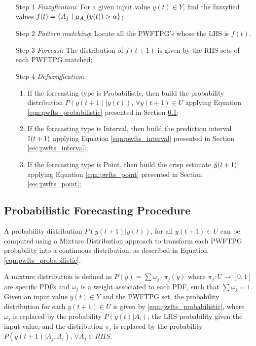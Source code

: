 \begin{enumerate}
\item[Step 1] \textit{Fuzzyfication}: For a given input value $y(t) \in Y$, find the fuzzyfied values $f(t) = \{\ufset \ |\ \mu_{\ufset}(y(t)) > \alpha\}$;
\item[Step 2] \textit{Pattern matching}:  Locate all the PWFTPG's whose the LHS is $f(t)$.
\item[Step 3] \textit{Forecast}: The distribution of $f(t+1)$ is given by the RHS sets of each PWFTPG matched;
\item[Step 4] \textit{Defuzzyfication}: 
\begin{enumerate}
    \item If the forecasting type is Probabilistic, then build the probability distribution $P(y(t+1) | y(t))$, $\forall y(t+1) \in U$ applying Equation \ref{eqn:pwfts_probabilistic} presented in Section \ref{sec:pwfts_probabilistic};
    \item If the forecasting type is Interval, then build the prediction interval $\mathbb{I}(t+1)$ applying Equation \ref{eqn:pwfts_interval} presented in Section \ref{sec:pwfts_interval};
    \item If the forecasting type is Point, then build the crisp estimate $\hat{y}(t+1)$ applying Equation \ref{eqn:pwfts_point} presented in Section \ref{sec:pwfts_point};
\end{enumerate}

\end{enumerate}


\subsection{Probabilistic Forecasting Procedure}
\label{sec:pwfts_probabilistic}

A probability distribution $P( y(t+1) | y(t))$, for all  $y(t+1) \in U$ can be computed using a Mixture Distribution approach to transform each PWFTPG probability into a continuous distribution, as described in Equation \ref{eqn:pwfts_probabilistic}.

A mixture distribution is defined as $P(y) = \sum \omega_j \cdot \pi_j(y)$ where $\pi_j: U \rightarrow [0,1]$ are specific PDFs and $\omega_j$ is a weight associated to each PDF, such that $\sum \omega_j = 1$. Given an input value $y(t) \in Y$ and the PWFTPG set, the probability distribution for each $y(t+1) \in U$ is given by \eqref{eqn:pwfts_probabilistic}, where $\omega_j$ is replaced by the probability $P(y(t)|A_i)$, the LHS probability given the input value, and the distribution $\pi_j$ is replaced by the probability $P(y(t+1)|A_j,A_i)$, $\forall A_j \in RHS$. 

